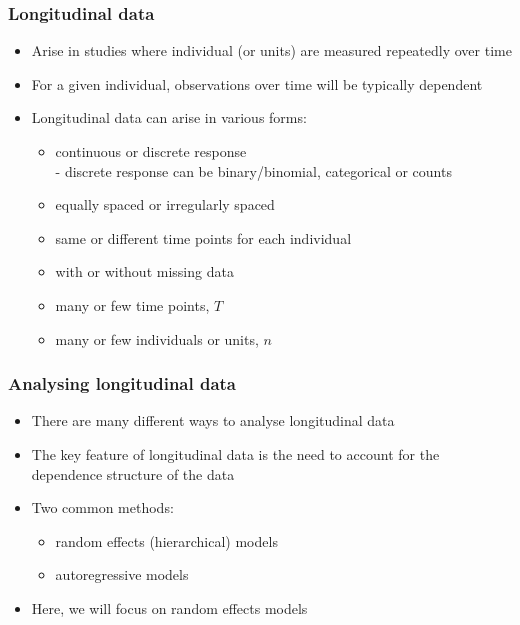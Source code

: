 \documentclass{beamer}
\begin{document}
\begin{frame}
    \frametitle{Longitudinal data}
    \begin{itemize}
        \item Arise in studies where individual (or units) are measured repeatedly over time\vspace{2mm}
        \item For a given individual, observations over time will be typically dependent\vspace{2mm}
        \item Longitudinal data can arise in various forms:\vspace{1mm}
        \begin{itemize}
            \item continuous or discrete response\\- discrete response can be binary/binomial, categorical or counts\vspace{1mm}
            \item equally spaced or irregularly spaced\vspace{1mm}
            \item same or different time points for each individual\vspace{1mm}
            \item with or without missing data\vspace{1mm}
            \item many or few time points, $T$\vspace{1mm}
            \item many or few individuals or units, $n$
        \end{itemize}
    \end{itemize}
\end{frame}

\begin{frame}
    \frametitle{Analysing longitudinal data}
    \begin{itemize}
        \item There are many different ways to analyse longitudinal data\vspace{2mm}
        \item The key feature of longitudinal data is the need to account for the dependence structure of the data\vspace{2mm}
        \item Two common methods:\vspace{1mm}
        \begin{itemize}
            \item random effects (hierarchical) models\vspace{1mm}
            \item autoregressive models\vspace{2mm}
        \end{itemize}
        \item Here, we will focus on random effects models
    \end{itemize}
\end{frame}
\end{document}
